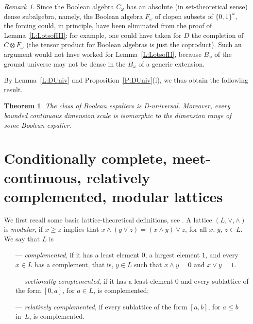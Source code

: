 \documentclass[psamsfonts,reqno]{memo-l}
\theoremstyle{plain}
\newtheorem{theorem}[lemma]{Theorem}
\theoremstyle{definition}
\theoremstyle{remark}
\newtheorem{remark}[lemma]{Remark}
\numberwithin{equation}{section}
\newcommand{\Bo}{B_{\omega}}
\newcommand{\Co}{C_{\omega}}
\newcommand{\set}[1]{\{#1\}}
\begin{document}
\begin{remark}\label{Rk:IIneedsforc}
Since the Boolean algebra $\Co$ has an
absolute (in set-the\-o\-ret\-i\-cal sense) dense subalgebra,
namely, the Boolean algebra $F_\omega$ of clopen
subsets of
$\set{0,1}^\omega$, the forcing could, in principle, have been eliminated
from the proof of Lemma~\ref{L:LotsofIII}: for example, one could have taken
for $D$ the completion of $C\otimes F_\omega$ (the tensor product for Boolean
algebras is just the coproduct). Such an
argument would not have worked for Lemma~\ref{L:LotsofII}, because $\Bo$ of
the ground universe may not be dense in the $\Bo$ of a generic
extension.
\end{remark}

By Lemma~\ref{L:DUniv} and Proposition~\ref{P:DUniv}(i), we thus obtain the
following result.

\begin{theorem}\label{T:MeasDUniv}
The class of Boolean espaliers is
D-universal. Moreover, every bounded continuous dimension scale is isomorphic to the dimension
range of some Boolean
espalier.
\end{theorem}


\section[Complete meet-continuous lattices]
{Conditionally complete, meet-continuous, relatively complemented,
modular lattices}\label{S:CMSMLatt}

We first recall some basic lattice-theoretical definitions, see
\cite{GLT2}. A
lattice $(L,\vee,\wedge)$ is \emph{modular},
if $x\geq z$ implies that
$x\wedge(y\vee z)=(x\wedge y)\vee z$, for all $x$, $y$, $z\in L$. We say that
$L$ is
\begin{itemize}
\item[---] \emph{complemented},
if it has a least element $0$, a largest
element $1$, and every $x\in L$ has a complement, that is, $y\in L$ such that
$x\wedge y=0$ and $x\vee y=1$.

\item[---] \emph{sectionally complemented},
if it has a least element $0$ and
every sublattice of the form $[0,a]$, for $a\in L$, is complemented;

\item[---] \emph{relatively complemented},
if every sublattice of the form
$[a,b]$, for $a\leq b$ in~$L$, is complemented.
\end{itemize}
\end{document}
